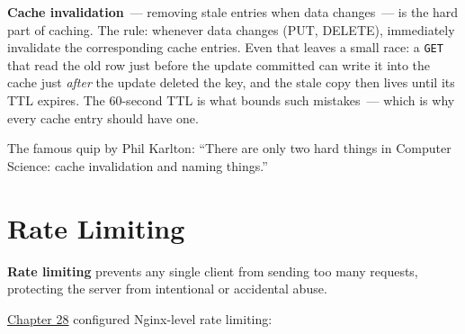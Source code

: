 \begin{codebox}
\begin{Shaded}
\begin{Highlighting}[]
\SpecialCharTok{\{}\SpecialCharTok{\}}\NormalTok{)}


\NormalTok{(}\OperatorTok{=}\NormalTok{[}\NormalTok{])}
\NormalTok{):}

\SpecialCharTok{\{}\SpecialCharTok{\}}\NormalTok{)}

     \NormalTok{, }
\end{Highlighting}
\end{Shaded}

\end{codebox}

\noindent{}\textbf{Cache invalidation}~--- removing stale entries when data changes~--- is the hard part of caching. The rule: whenever data changes (PUT, DELETE), immediately invalidate the corresponding cache entries. Even that leaves a small race: a \texttt{GET} that read the old row just before the update committed can write it into the cache just \emph{after} the update deleted the key, and the stale copy then lives until its TTL expires. The 60-second TTL is what bounds such mistakes~--- which is why every cache entry should have one.

The famous quip by Phil Karlton: ``There are only two hard things in Computer Science: cache invalidation and naming things.''

\setcounter{section}{6}
\section{Rate Limiting}\label{36-scaling-load:367-rate-limiting}

\textbf{Rate limiting} prevents any single client from sending too many requests, protecting the server from intentional or accidental abuse.

\hyperref[ch:28-traffic-routing]{Chapter 28} configured Nginx-level rate limiting:

